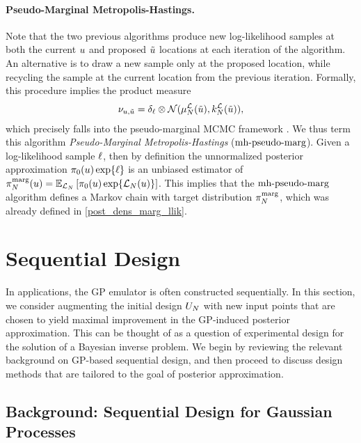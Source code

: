 \documentclass[12pt]{article}
\begin{document}
\paragraph{Pseudo-Marginal Metropolis-Hastings.}
Note that the two previous algorithms produce new log-likelihood samples at both the current $\Par$ and proposed 
$\propPar$ locations at each iteration of the algorithm. An alternative is to draw a new sample only at the 
proposed location, while recycling the sample at the current location from the previous iteration. Formally, this procedure
implies the product measure 
\begin{align}
\llikSampDist_{\Par, \propPar} 
= \delta_{\llikSamp} \otimes  
\Gaussian(\emMean[\Ndesign]{\llik}(\propPar), \emKer[\Ndesign]{\llik}(\propPar)), \label{llik_dist_pseudo_marg}
\end{align}
which precisely falls into the pseudo-marginal MCMC framework \cite{pseudoMarginalMCMC}. 
We thus term 
this algorithm \textit{Pseudo-Marginal Metropolis-Hastings} ($\mhPseudoMargLabel$). Given a log-likelihood sample 
$\llikSamp$, then by definition the unnormalized posterior approximation $\priorDens(\Par) \Exp{\llikSamp}$ is 
an unbiased estimator of 
$\llikEmMargDens[\Ndesign](\Par) = \E_{\llikEm[\Ndesign]}\left[\priorDens(\Par) \Exp{\llikEm[\Ndesign](\Par)} \right]$. 
This implies that the $\mhPseudoMargLabel$ algorithm defines a Markov chain with target distribution 
$\llikEmMargDens[\Ndesign]$, which was already defined in \ref{post_dens_marg_llik}. 


\section{Sequential Design}
In applications, the GP emulator is often constructed sequentially. In this section, we consider augmenting the 
initial design $\designIn[\Ndesign]$ with new input points that are chosen to yield maximal improvement in the 
GP-induced posterior approximation. This can be thought of as a question of experimental design for the 
solution of a Bayesian inverse problem. We begin by reviewing the relevant background on GP-based 
sequential design, and then proceed to discuss design methods that are tailored to the goal of 
posterior approximation.  

\subsection{Background: Sequential Design for Gaussian Processes}
\end{document}
